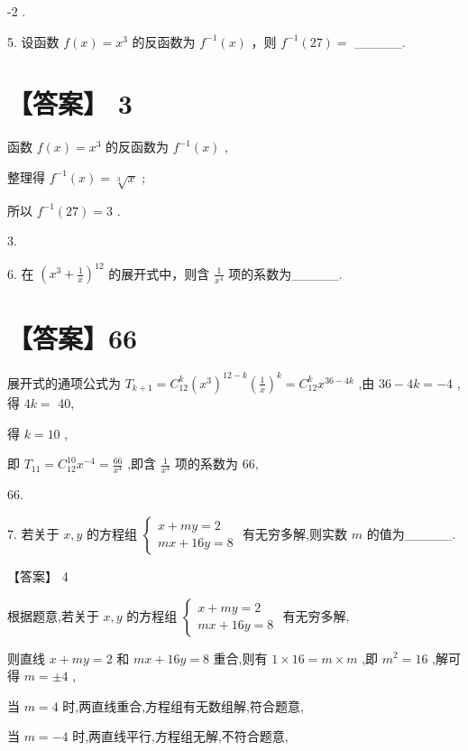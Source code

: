 \documentclass[10pt]{article}
\begin{document}
-2 .

5. 设函数 \(f\left( x\right)  = {x}^{3}\) 的反函数为 \({f}^{-1}\left( x\right)\) ，则 \({f}^{-1}\left( {27}\right)  =\) \_\_\_\_\_.

\section*{【答案】 3}

函数 \(f\left( x\right)  = {x}^{3}\) 的反函数为 \({f}^{-1}\left( x\right)\) ,

整理得 \({f}^{-1}\left( x\right)  = \sqrt[3]{x}\) ;

所以 \({f}^{-1}\left( {27}\right)  = 3\) .

3.

6. 在 \({\left( {x}^{3} + \frac{1}{x}\right) }^{12}\) 的展开式中，则含 \(\frac{1}{{x}^{4}}\) 项的系数为\_\_\_\_\_.

\section*{【答案】66}

展开式的通项公式为 \({T}_{k + 1} = {C}_{12}^{k}{\left( {x}^{3}\right) }^{{12} - k}{\left( \frac{1}{x}\right) }^{k} = {C}_{12}^{k}{x}^{{36} - {4k}}\) ,由 \({36} - {4k} =  - 4\) ,得 \({4k} =\) 40,

得 \(k = {10}\) ,

即 \({T}_{11} = {C}_{12}^{10}{x}^{-4} = \frac{66}{{x}^{4}}\) ,即含 \(\frac{1}{{x}^{4}}\) 项的系数为 66,

66.

7. 若关于 \(x,y\) 的方程组 \(\left\{  \begin{array}{l} x + {my} = 2 \\  {mx} + {16y} = 8 \end{array}\right.\) 有无穷多解,则实数 \(m\) 的值为\_\_\_\_\_.

【答案】 4

根据题意,若关于 \(x,y\) 的方程组 \(\left\{  \begin{array}{l} x + {my} = 2 \\  {mx} + {16y} = 8 \end{array}\right.\) 有无穷多解,

则直线 \(x + {my} = 2\) 和 \({mx} + {16y} = 8\) 重合,则有 \(1 \times  {16} = m \times  m\) ,即 \({m}^{2} = {16}\) ,解可得 \(m =  \pm  4\) ,

当 \(m = 4\) 时,两直线重合,方程组有无数组解,符合题意,

当 \(m =  - 4\) 时,两直线平行,方程组无解,不符合题意,
\end{document}
